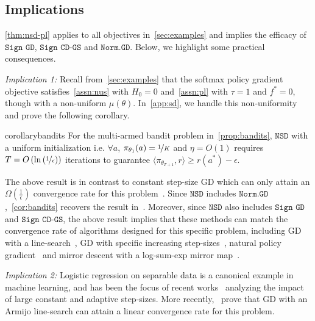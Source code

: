\documentclass{article}
\newcommand{\NSD}{\texttt{NSD}}
\newcommand{\NormGD}{\texttt{Norm.GD}}
\newcommand{\SignGD}{\texttt{Sign GD}}
\newcommand{\SignCD}{\texttt{Sign CD-GS}}
\begin{document}
\subsection{Implications}
\label{sec:nsd-implications}
\cref{thm:nsd-pl} applies to all objectives in~\cref{sec:examples} and implies the efficacy of $\SignGD$, $\SignCD$ and $\NormGD$. Below, we highlight some practical consequences. 

\textit{Implication 1:} Recall from~\cref{sec:examples} that the softmax policy gradient objective satisfies~\cref{assn:nus} with $H_0 = 0$ and~\cref{assn:pl} with $\tau = 1$ and $f^* = 0$, though with a non-uniform $\mu(\theta)$. In~\cref{app:sd}, we handle this non-uniformity and prove the following corollary. 
\begin{restatable}{corollary}{bandits}
For the multi-armed bandit problem in~\cref{prop:bandits}, $\NSD$ with a uniform initialization i.e. $\forall a$, $\pi_{\theta_1}(a) = \nicefrac{1}{K}$ and $\eta = O(1)$ requires $T = O\left(\ln\left(\nicefrac{1}{\epsilon}\right) \right)$ iterations to guarantee $\langle \pi_{\theta_{T+1}}, r \rangle \geq r(a^*) - \epsilon$.
\label{cor:bandits}
\end{restatable}
The above result is in contrast to constant step-size GD which can only attain an $\Omega\left(\frac{1}{\epsilon}\right)$ convergence rate for this problem~\citep[Theorem 9]{mei2020global}. Since $\NSD$ includes $\NormGD$,~\cref{cor:bandits} recovers the result in~\citet{mei2021leveraging}. Moreover, since $\NSD$ also includes $\SignGD$ and $\SignCD$, the above result implies that these methods can match the convergence rate of algorithms designed for this specific problem, including GD with a line-search~\citep{lu2024towards,vaswani2025armijo}, GD with specific increasing step-sizes~\citep{liu2024elementary}, natural policy gradient~\citep{kakade2002approximately,xiao2022convergence} and mirror descent with a log-sum-exp mirror map~\citep{asad2024fast}. 

\textit{Implication 2:} Logistic regression on separable data is a canonical example in machine learning, and has been the focus of recent works~\citep{wu2024large,zhang2025minimax} analyzing the impact of large constant and adaptive step-sizes. More recently,~\citet{vaswani2025armijo} prove that GD with an Armijo line-search can attain a linear convergence rate for this problem. 
\end{document}
